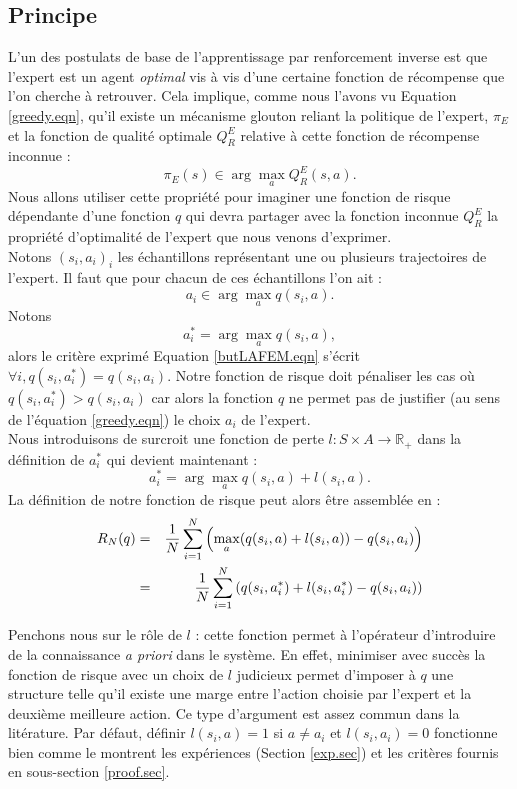 \documentclass[publibook-draft]{CAp2012}
\begin{document}
\subsection{Principe}
L'un des postulats de base de l'apprentissage par renforcement inverse est que l'expert est un agent \emph{optimal} vis à vis d'une certaine fonction de récompense que l'on cherche à retrouver. Cela implique, comme nous l'avons vu Equation \ref{greedy.eqn}, qu'il existe un mécanisme glouton reliant la politique de l'expert, $\pi_E$ et la fonction de qualité optimale $Q^E_R$ relative à cette fonction de récompense inconnue :
\begin{equation}
\pi_E(s) \in \arg\max_aQ^E_R(s,a).
\end{equation}
Nous allons utiliser cette propriété pour imaginer une fonction de risque dépendante d'une fonction $q$ qui devra partager avec la fonction inconnue $Q^E_R$ la propriété d'optimalité de l'expert que nous venons d'exprimer.\\
Notons $(s_i,a_i)_i$ les échantillons représentant une ou plusieurs trajectoires de l'expert. Il faut que pour chacun de ces échantillons l'on ait :
\begin{equation}
\label{butLAFEM.eqn}
a_i \in \arg\max_aq(s_i,a).
\end{equation}
Notons
\begin{equation}
a^*_i = \arg\max_aq(s_i,a),
\end{equation}
alors le critère exprimé Equation \ref{butLAFEM.eqn} s'écrit $\forall i, q(s_i,a^*_i) = q(s_i,a_i)$. Notre fonction de risque doit pénaliser les cas où $q(s_i,a^*_i)>q(s_i,a_i)$ car alors la fonction $q$ ne permet pas de justifier (au sens de l'équation \ref{greedy.eqn}) le choix $a_i$ de l'expert.\\
Nous introduisons de surcroit une fonction de perte $l : S \times A \rightarrow \mathbb{R}_+$ dans la définition de $a^*_i$ qui devient maintenant :
\begin{equation}
\label{astar.def}
a^*_i = \arg\max_aq(s_i,a) + l(s_i,a).
\end{equation}
La définition de notre fonction de risque peut alors être assemblée en :
  \begin{eqnarray}
   R_N(q) &=& {1\over N} \sum_{i=1}^N\left(\max_{a}(q(s_i,a) + l(s_i,a)) - q(s_i,a_i) \right)\\
   &=& {1\over N} \sum_{i=1}^N\left(q(s_i,a_i^*) + l(s_i,a_i^*) - q(s_i,a_i) \right)
   \end{eqnarray}

Penchons nous sur le rôle de $l$ : cette fonction permet à l'opérateur d'introduire de la connaissance \emph{a priori} dans le système. En effet, minimiser avec succès la fonction de risque avec un choix de $l$ judicieux permet d'imposer à $q$ une structure telle qu'il existe une marge entre l'action choisie par l'expert et la deuxième meilleure action. Ce type d'argument est assez commun dans la litérature. Par défaut, définir $l(s_i,a) = 1$ si $a\neq a_i$ et $l(s_i,a_i)=0$ fonctionne bien comme le montrent les expériences (Section \ref{exp.sec}) et les critères fournis en sous-section \ref{proof.sec}.\\
\end{document}
